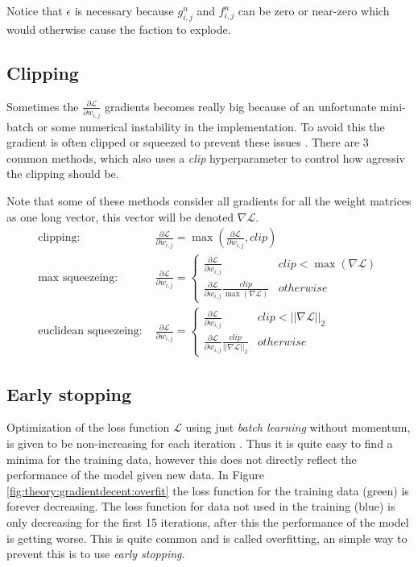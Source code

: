 Notice that $\epsilon$ is necessary because $g_{i,j}^n$ and $f_{i,j}^n$ can be zero or near-zero which would otherwise cause the faction to explode.

\subsection{Clipping}

Sometimes the $\frac{\partial \mathcal{L}}{\partial w_{i,j}}$ gradients becomes really big because of an unfortunate mini-batch or some numerical instability in the implementation. To avoid this the gradient is often clipped or squeezed to prevent these issues \cite{graves-generating-sequences}. There are 3 common methods, which also uses a \textit{clip} hyperparameter to control how agressiv the clipping should be.

Note that some of these methods consider all gradients for all the weight matrices as one long vector, this vector will be denoted $\nabla \mathcal{L}$.
\begin{align}
\text{clipping: } & \frac{\partial \mathcal{L}}{\partial w_{i,j}} = \max\left(\frac{\partial \mathcal{L}}{\partial w_{i,j}}, clip\right) \\
\text{max squeezeing: } & \frac{\partial \mathcal{L}}{\partial w_{i,j}} = \begin{cases}
	\frac{\partial \mathcal{L}}{\partial w_{i,j}} & clip < \max(\nabla \mathcal{L}) \\
	\frac{\partial \mathcal{L}}{\partial w_{i,j}} \frac{clip}{\max(\nabla \mathcal{L})} & otherwise
\end{cases} \\
\text{euclidean squeezeing: } & \frac{\partial \mathcal{L}}{\partial w_{i,j}} = \begin{cases}
	\frac{\partial \mathcal{L}}{\partial w_{i,j}} & clip < ||\nabla \mathcal{L}||_2 \\
	\frac{\partial \mathcal{L}}{\partial w_{i,j}} \frac{clip}{||\nabla \mathcal{L}||_2} & otherwise
\end{cases}
\end{align}

\subsection{Early stopping}

Optimization of the loss function $\mathcal{L}$ using just \textit{batch learning} without momentum, is given to be non-increasing for each iteration \cite{bishop}. Thus it is quite easy to find a minima for the training data, however this does not directly reflect the performance of the model given new data. In Figure \ref{fig:theory:gradientdecent:overfit} the loss function for the training data (green) is forever decreasing. The loss function for data not used in the training (blue) is only decreasing for the first 15 iterations, after this the performance of the model is getting worse. This is quite common and is called overfitting, an simple way to prevent this is to use \textit{early stopping}.

